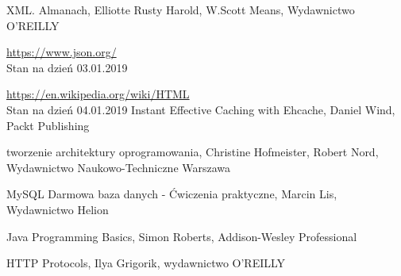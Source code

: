 \documentclass[12pt, twoside]{report}
\begin{document}
\begin{thebibliography}{9}
XML. Almanach, Elliotte Rusty Harold, W.Scott Means, Wydawnictwo O'REILLY

  \url{https://www.json.org/} \\
  Stan na dzień 03.01.2019

	\url{https://en.wikipedia.org/wiki/HTML} \\
	Stan na dzień 04.01.2019
Instant Effective Caching with Ehcache, Daniel Wind, Packt Publishing


tworzenie architektury oprogramowania, Christine Hofmeister, Robert Nord, Wydawnictwo Naukowo-Techniczne Warszawa

MySQL Darmowa baza danych - Ćwiczenia praktyczne, Marcin Lis, Wydawnictwo Helion

Java Programming Basics, Simon Roberts, Addison-Wesley Professional

HTTP Protocols, Ilya Grigorik, wydawnictwo O'REILLY
\end{thebibliography}
\end{document}
